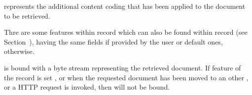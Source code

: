 \documentclass{ozdoc}
\begin{document}
\begin{mozartDESCRIPTION}
 represents the additional content coding that has been applied to the document to be retrieved. \mozartEMPTY
{}\mozartENTRYHASCODE
\begin{mozartSYNOPSIS}
\begin{mozartCODEDISPLAY}\mozartFACETEXT{)\mozartSPACE{}}\end{mozartCODEDISPLAY}
\end{mozartSYNOPSIS}
\mozartITEM Thre are some features within  record which can also be found within  record (see Section~), having the same fields if provided by the user or default ones, otherwise.   \mozartEMPTY
 

 is bound with a byte stream representing the retrieved document. If  feature of the  record is set , or when the requested document has been moved to an other , or a  HTTP request is invoked, then  will not be bound.


\end{mozartDESCRIPTION}
\end{document}

